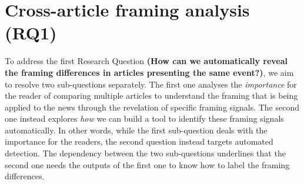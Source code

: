 



\section{Cross-article framing analysis (RQ1)}
\label{sec:prop_rq1}

To address the first Research Question
\textbf{(How can we automatically reveal the framing differences in articles presenting the same event?)}, we aim to resolve two sub-questions separately. The first one analyses the \emph{importance} for the reader of comparing multiple articles to understand the framing that is being applied to the news through the revelation of specific framing signals. The second one instead explores \emph{how} we can build a tool to identify these framing signals automatically.
In other words, while the first sub-question deals with the importance for the readers, the second question instead targets automated detection.
The dependency between the two sub-questions underlines that the second one needs the outputs of the first one to know how to label the framing differences.



